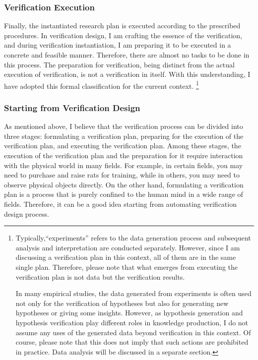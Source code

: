 \subsubsection{Verification Execution}
Finally, the instantiated research plan is executed according to the prescribed procedures. In verification design, I am crafting the essence of the verification, and during verification instantiation, I am preparing it to be executed in a concrete and feasible manner. Therefore, there are almost no tasks to be done in this process. The preparation for verification, being distinct from the actual execution of verification, is not a verification in itself. With this understanding, I have adopted this formal classification for the current context.
\footnote{
Typically,``experiments'' refers to the data generation process and subsequent analysis and interpretation are conducted separately. However, since I am discussing a verification plan in this context, all of them are in the same single plan. Therefore, please note that what emerges from executing the verification plan is not data but the verification results.

In many empirical studies, the data generated from experiments is often used not only for the verification of hypotheses but also for generating new hypotheses or giving some insights. However, as hypothesis generation and hypothesis verification play different roles in knowledge production, I do not assume any uses of the generated data beyond verification in this context. Of course, please note that this does not imply that such actions are prohibited in practice. Data analysis will be discussed in a separate section.
}

\subsubsection{Starting from Verification Design}

As mentioned above, I believe that the verification process can be divided into three stages: formulating a verification plan, preparing for the execution of the verification plan, and executing the verification plan. Among these stages, the execution of the verification plan and the preparation for it require interaction with the physical world in many fields. For example, in certain fields, you may need to purchase and raise rats for training, while in others, you may need to observe physical objects directly. On the other hand, formulating a verification plan is a process that is purely confined to the human mind in a wide range of fields. Therefore, it can be a good idea starting from automating verification design process.

